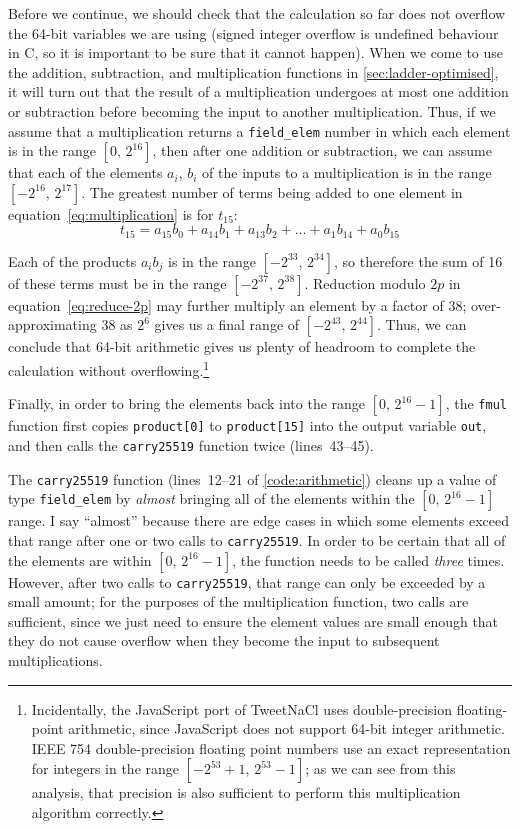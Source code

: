 \documentclass[manuscript]{acmart}
\begin{document}
Before we continue, we should check that the calculation so far does not overflow the 64-bit variables we are using (signed integer overflow is undefined behaviour in C, so it is important to be sure that it cannot happen).
When we come to use the addition, subtraction, and multiplication functions in \autoref{sec:ladder-optimised}, it will turn out that the result of a multiplication undergoes at most one addition or subtraction before becoming the input to another multiplication.
Thus, if we assume that a multiplication returns a \verb|field_elem| number in which each element is in the range $[0,\, 2^{16}]$, then after one addition or subtraction, we can assume that each of the elements $a_i$, $b_i$ of the inputs to a multiplication is in the range $[-2^{16},\, 2^{17}]$.
The greatest number of terms being added to one element in equation~\eqref{eq:multiplication} is for $t_{15}$:
\[ t_{15} = a_{15} b_0 + a_{14} b_1 + a_{13} b_2 + \dots + a_1 b_{14} + a_0 b_{15} \]

Each of the products $a_i b_j$ is in the range $[-2^{33},\, 2^{34}]$, so therefore the sum of 16 of these terms must be in the range $[-2^{37},\, 2^{38}]$.
Reduction modulo $2p$ in equation~\eqref{eq:reduce-2p} may further multiply an element by a factor of 38; over-approximating 38 as $2^6$ gives us a final range of $[-2^{43},\, 2^{44}]$.
Thus, we can conclude that 64-bit arithmetic gives us plenty of headroom to complete the calculation without overflowing.\footnote{Incidentally, the JavaScript port of TweetNaCl uses double-precision floating-point arithmetic, since JavaScript does not support 64-bit integer arithmetic.
IEEE 754 double-precision floating point numbers use an exact representation for integers in the range $[-2^{53}+1,\, 2^{53}-1]$; as we can see from this analysis, that precision is also sufficient to perform this multiplication algorithm correctly.}

Finally, in order to bring the elements back into the range $[0,\, 2^{16}-1]$, the \verb|fmul| function first copies \verb|product[0]| to \verb|product[15]| into the output variable \verb|out|, and then calls the \verb|carry25519| function twice (lines~43--45).

The \verb|carry25519| function (lines~12--21 of \autoref{code:arithmetic}) cleans up a value of type \verb|field_elem| by \emph{almost} bringing all of the elements within the $[0,\, 2^{16}-1]$ range.
I say ``almost'' because there are edge cases in which some elements exceed that range after one or two calls to \verb|carry25519|.
In order to be certain that all of the elements are within $[0,\, 2^{16}-1]$, the function needs to be called \emph{three} times.
However, after two calls to \verb|carry25519|, that range can only be exceeded by a small amount; for the purposes of the multiplication function, two calls are sufficient, since we just need to ensure the element values are small enough that they do not cause overflow when they become the input to subsequent multiplications.
\end{document}
